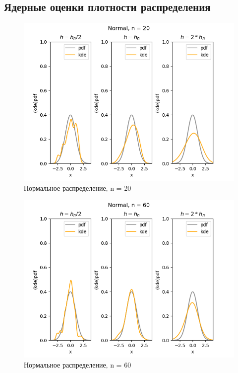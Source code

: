 \documentclass[../body.tex]{subfiles}
\begin{document}
\subsection{Ядерные оценки плотности распределения}
\begin{figure}[H]
	\centering
	\includegraphics[width=\textwidth, height =0.4\textheight]{img/NormalKDE n = 20.png}
	\caption{Нормальное распределение, n = 20}
	\label{fig:normal_kde_20}
\end{figure}

\begin{figure}[H]
	\centering
	\includegraphics[width=\textwidth, height =0.4\textheight]{img/NormalKDE n = 60.png}
	\caption{Нормальное распределение, n = 60}
	\label{fig:normal_kde_60}
\end{figure}
\end{document}

